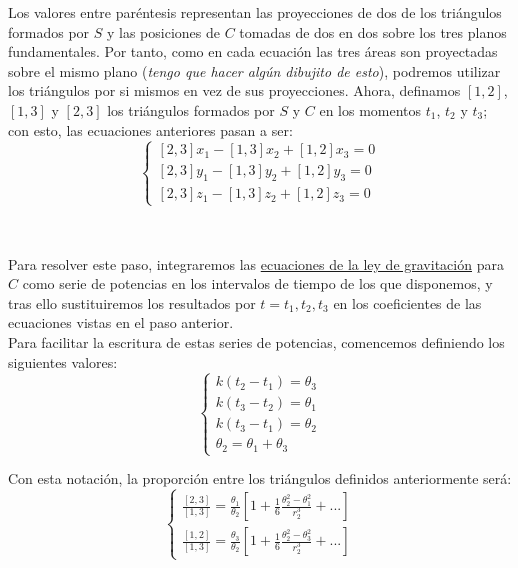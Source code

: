 \documentclass[11pt]{article}
\begin{document}
Los valores entre paréntesis representan las proyecciones de dos de los triángulos formados por $S$ y las posiciones de $C$ tomadas de dos en dos sobre los tres planos fundamentales. Por tanto, como en cada ecuación las tres áreas son proyectadas sobre el mismo plano (\textit{tengo que hacer algún dibujito de esto}), podremos utilizar los triángulos por si mismos en vez de sus proyecciones. Ahora, definamos $[1,2]$, $[1,3]$ y $[2,3]$ los triángulos formados por $S$ y $C$ en los momentos $t_1$, $t_2$ y $t_3$; con esto, las ecuaciones anteriores pasan a ser:
\[
\left\{
\begin{array}{l}
	[2,3]x_1-[1,3]x_2+[1,2]x_3=0\\
	{[2,3]}y_1-[1,3]y_2+[1,2]y_3=0\\
	{[2,3]}z_1-[1,3]z_2+[1,2]z_3=0
\end{array}
\right.
\]\\

\subsection{}
Para resolver este paso, integraremos las \hyperref[eq:ley_gracitacion_C]{ecuaciones de la ley de gravitación} para $C$ como serie de potencias en los intervalos de tiempo de los que disponemos, y tras ello sustituiremos los resultados por $t=t_1,t_2,t_3$ en los coeficientes de las ecuaciones vistas en el paso anterior.\\

Para facilitar la escritura de estas series de potencias, comencemos definiendo los siguientes valores:
\[
\left\{
\begin{array}{l}
	k(t_2-t_1)=\theta_3\\
	k(t_3-t_2)=\theta_1\\
	k(t_3-t_1)=\theta_2\\
	\theta_2=\theta_1+\theta_3
\end{array}
\right.
\]

Con esta notación, la proporción entre los triángulos definidos anteriormente será:
\[
\left\{
\begin{array}{l}
	\frac{[2,3]}{[1,3]}=\frac{\theta_1}{\theta_2}[1+\frac{1}{6}\frac{\theta_2^2-\theta_1^2}{r_2^3}+...]\\
	\frac{[1,2]}{[1,3]}=\frac{\theta_3}{\theta_2}[1+\frac{1}{6}\frac{\theta_2^2-\theta_3^2}{r_2^3}+...]
\end{array}
\right.
\]\\
\end{document}
